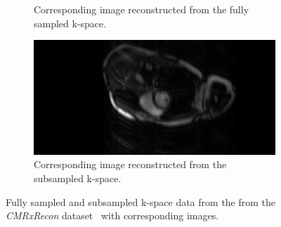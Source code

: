 \begin{figure}[h]
\begin{subfigure}{0.45\textwidth}
    		\caption{Corresponding image reconstructed from the fully sampled k-space.}
    		\label{fig:fullySampledImage}
	\end{subfigure}
	\hfill
	\begin{subfigure}{0.45\textwidth}
    		\includegraphics[width=\textwidth]{image_subsampled.png}
    		\caption{Corresponding image reconstructed from the subsampled k-space.}
    		\label{fig:subSampledImage}
	\end{subfigure}
	\caption{Fully sampled and subsampled k-space data from the from the \emph{CMRxRecon} dataset~\cite{CMRxRecon} with corresponding images.}
	\label{fig:k-space}
\end{figure}






